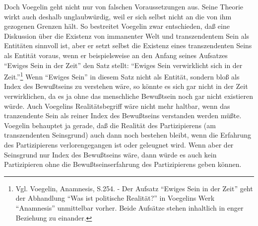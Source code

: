 Doch Voegelin geht nicht nur von falschen Voraussetzungen aus. Seine
Theorie wirkt auch deshalb unglaubwürdig, weil er sich selbst nicht an die von
ihm gezogenen Grenzen hält. So bestreitet Voegelin zwar entschieden, daß eine
Diskussion über die Existenz von immanenter Welt und transzendentem Sein als
Entitäten sinnvoll ist, aber er setzt selbst die Existenz eines transzendenten
Seins als Entität voraus, wenn er beispielsweise an den Anfang seines
Aufsatzes "`Ewiges Sein in der Zeit"' den Satz stellt: "`Ewiges Sein
verwirklicht sich in der Zeit."'\footnote{Vgl. Voegelin, Anamnesis, S.254. -
  Der Aufsatz "`Ewiges Sein in der Zeit"' geht der Abhandlung "`Was ist
  politische Realität?"' in Voegelins Werk "`Anamnesis"' unmittelbar vorher.
  Beide Aufsätze stehen inhaltlich in enger Beziehung zu einander.} Wenn
"`Ewiges Sein"' in diesem Satz nicht als Entität, sondern bloß als Index des
Bewußtseins zu verstehen wäre, so könnte es sich gar nicht in der Zeit
verwirklichen, da es ja ohne das menschliche Bewußtsein noch gar nicht
existieren würde. Auch Voegelins Realitätsbegriff wäre nicht mehr haltbar,
wenn das tranzendente Sein als reiner Index des Bewußtseins verstanden werden
müßte. Voegelin behauptet ja gerade, daß die Realität des Partizipierens (am
transzendenten Seinsgrund) auch dann noch bestehen bleibt, wenn die Erfahrung
des Partizipierens verlorengegangen ist oder geleugnet wird. Wenn aber der
Seinsgrund nur Index des Bewußtseins wäre, dann würde es auch kein
Partizipieren ohne die Bewußtseinserfahrung des Partizipierens geben können. 


